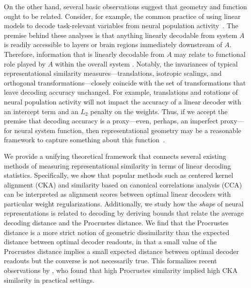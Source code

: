 On the other hand, several basic observations suggest that geometry and function ought to be related.
Consider, for example, the common practice of using linear models to decode task-relevant variables from neural population activity~\cite{alain2017understanding,Kriegeskorte2019}.
The premise behind these analyses is that anything linearly decodable from system $A$ is readily accessible to layers or brain regions immediately downstream of $A$.
Therefore, information that is linearly decodable from $A$ may relate to functional role played by $A$ within the overall system \cite{Cao2022}.
Notably, the invariances of typical representational similarity measures---translations, isotropic scalings, and orthogonal transformations---closely coincide with the set of transformations that leave decoding accuracy unchanged.
For example, translations and rotations of neural population activity will not impact the accuracy of a linear decoder with an intercept term and an $L_2$ penalty on the weights.
Thus, if we accept the premise that decoding accuracy is a proxy---even, perhaps, an imperfect proxy---for neural system function, then representational geometry may be a reasonable framework to capture something about this function~\cite{kriegeskorte2019peeling}.

We provide a unifying theoretical framework that connects several existing methods of measuring representational similarity in terms of linear decoding statistics.  
Specifically, we show that popular methods such as centered kernel alignment (CKA) \cite{kornblith2019} and similarity based on canonical correlations analysis (CCA) \cite{raghu2017svcca} can be interpreted as alignment scores between optimal linear decoders with particular weight regularizations.  
Additionally, we study how the \emph{shape} of neural representations is related to decoding by deriving bounds that relate the average decoding distance and the Procrustes distance.  
We find that the Procrustes distance is a more 
strict notion of geometric dissimilarity than the expected distance between optimal decoder readouts, in that a small value of the Procrustes distance implies a small expected distance between optimal decoder readouts but the converse is not necessarily true.  
This formalizes recent observations by \textcite{cloos2024differentiable}, who found that high Procrustes similarity implied high CKA similarity in practical settings.

